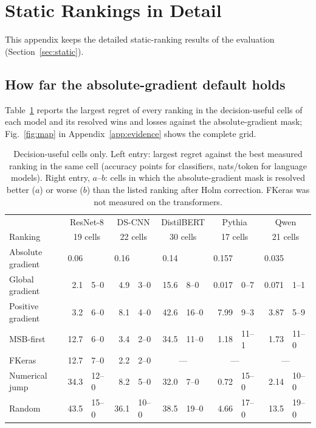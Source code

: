 \section{Static Rankings in Detail}\label{app:static}
This appendix keeps the detailed static-ranking results of the evaluation (Section~\ref{sec:static}).
\subsection{How far the absolute-gradient default holds}\label{sec:default}
Table~\ref{tab:regret} reports the largest regret of every ranking in the decision-useful cells of each model and its resolved wins and losses against the absolute-gradient mask; Fig.~\ref{fig:map} in Appendix~\ref{app:evidence} shows the complete grid.

\begin{table}[t]
\caption{Decision-useful cells only. Left entry: largest regret against the best measured ranking in the same cell (accuracy points for classifiers, nats/token for language models). Right entry, $a$--$b$: cells in which the absolute-gradient mask is resolved better ($a$) or worse ($b$) than the listed ranking after Holm correction. FKeras was not measured on the transformers.}\label{tab:regret}
\centering\small
\begin{tabular}{l r@{\ \ }l r@{\ \ }l r@{\ \ }l r@{\ \ }l r@{\ \ }l}\toprule
 & \multicolumn{2}{c}{ResNet-8} & \multicolumn{2}{c}{DS-CNN} & \multicolumn{2}{c}{DistilBERT} & \multicolumn{2}{c}{Pythia} & \multicolumn{2}{c}{Qwen}\\
Ranking & \multicolumn{2}{c}{19 cells} & \multicolumn{2}{c}{22 cells} & \multicolumn{2}{c}{30 cells} & \multicolumn{2}{c}{17 cells} & \multicolumn{2}{c}{21 cells}\\\midrule
Absolute gradient & 0.06 & & 0.16 & & 0.14 & & 0.157 & & 0.035 &\\
Global gradient & 2.1 & 5--0 & 4.9 & 3--0 & 15.6 & 8--0 & 0.017 & 0--7 & 0.071 & 1--1\\
Positive gradient & 3.2 & 6--0 & 8.1 & 4--0 & 42.6 & 16--0 & 7.99 & 9--3 & 3.87 & 5--9\\
MSB-first & 12.7 & 6--0 & 3.4 & 2--0 & 34.5 & 11--0 & 1.18 & 11--1 & 1.73 & 11--0\\
FKeras & 12.7 & 7--0 & 2.2 & 2--0 & \multicolumn{2}{c}{---} & \multicolumn{2}{c}{---} & \multicolumn{2}{c}{---}\\
Numerical jump & 34.3 & 12--0 & 8.2 & 5--0 & 32.0 & 7--0 & 0.72 & 15--0 & 2.14 & 10--0\\
Random & 43.5 & 15--0 & 36.1 & 10--0 & 38.5 & 19--0 & 4.66 & 17--0 & 13.5 & 19--0\\\bottomrule
\end{tabular}
\end{table}
